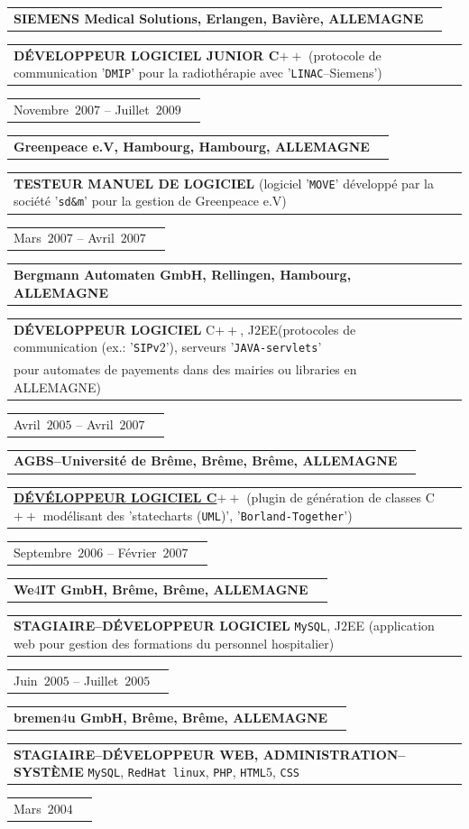 \documentclass[9pt,a4paper]{article} %
\makeatletter
\newcommand{\headerrow}[2]
{\begin{tabular*}{\linewidth}{l@{\extracolsep{\fill}}r}
	#1 &
	#2 \\
\end{tabular*}}
\newcommand{\headerrowONE}[1]{\headerrow{#1}{}}
\newcommand{\cplusplus}{C$++$\xspace}
\newcommand{\css}{\texttt{CSS}\xspace}
\newcommand{\html}{\texttt{HTML$5$}\xspace}
\newcommand{\jtwoee}{J$2$EE\xspace}
\newcommand{\php}{\texttt{PHP}\xspace}
\newcommand{\mysql}{\texttt{MySQL}\xspace}
\newcommand{\redhat}{\texttt{RedHat~linux}\xspace}
\newcommand{\cvitemdate}[2]{#1~$#2$\xspace}
\newcommand{\cvitempositionheld}[1]{\textbf{#1}\xspace}
\makeatother
\begin{document}
\vspace{0.3em}

\headerrowONE{\textbf{SIEMENS Medical Solutions, Erlangen, Bavière, ALLEMAGNE}}	
\headerrowONE{\cvitempositionheld{DÉVELOPPEUR LOGICIEL JUNIOR \cplusplus} (protocole 
de communication '\texttt{DMIP}' pour la radiothérapie avec '\texttt{LINAC}--Siemens')}
\headerrowONE{\cvitemdate{Novembre}{2007} -- \cvitemdate{Juillet}{2009}}	
	
\vspace{0.3em}

\headerrowONE{\textbf{Greenpeace e.V, Hambourg, Hambourg, ALLEMAGNE}}	
\headerrowONE{\cvitempositionheld{TESTEUR MANUEL DE LOGICIEL} 
(logiciel '\texttt{MOVE}' développé par la société '\texttt{sd\&m}' pour la gestion de Greenpeace e.V)}
\headerrowONE{\cvitemdate{Mars}{2007} -- \cvitemdate{Avril}{2007}}	

\vspace{0.3em}

\headerrowONE{\textbf{Bergmann Automaten GmbH, Rellingen, Hambourg, ALLEMAGNE}}	
\headerrowONE{\cvitempositionheld{DÉVELOPPEUR LOGICIEL} \cplusplus, \jtwoee (protocoles de
communication (ex.: '\texttt{SIPv$2$}'), serveurs '\texttt{JAVA-servlets}'\\
 pour automates de payements dans des mairies ou libraries en ALLEMAGNE)}
\headerrowONE{\cvitemdate{Avril}{2005} -- \cvitemdate{Avril}{2007}}	
	
\vspace{0.3em}

\headerrowONE{\textbf{AGBS--Université de Brême, Brême, Brême, ALLEMAGNE}}	
\headerrowONE{\href{http://www.informatik.uni-bremen.de/agbs/jp/papers/peleska_et_al_soqua2006.pdf}
	{\cvitempositionheld{DÉVÉLOPPEUR LOGICIEL \cplusplus}} (plugin de 
génération de classes \cplusplus modélisant des 'statecharts (\texttt{UML})', '\texttt{Borland-Together}')}
\headerrowONE{\cvitemdate{Septembre}{2006} -- \cvitemdate{Février}{2007}}	

\vspace{0.3em}

\headerrowONE{\textbf{We$4$IT GmbH, Brême, Brême, ALLEMAGNE}}	
\headerrowONE{\cvitempositionheld{STAGIAIRE--DÉVELOPPEUR LOGICIEL} \mysql, \jtwoee
(application web pour gestion des formations du personnel hospitalier)}
\headerrowONE{\cvitemdate{Juin}{2005} -- \cvitemdate{Juillet}{2005}}

\vspace{0.3em}

\headerrowONE{\textbf{bremen$4$u GmbH, Brême, Brême, ALLEMAGNE}}	
\headerrowONE{\cvitempositionheld{STAGIAIRE--DÉVELOPPEUR WEB, ADMINISTRATION--SYSTÈME} \mysql, \redhat, \php,
\html, \css}
\headerrowONE{\cvitemdate{Mars}{2004}}	
	
\end{document}
